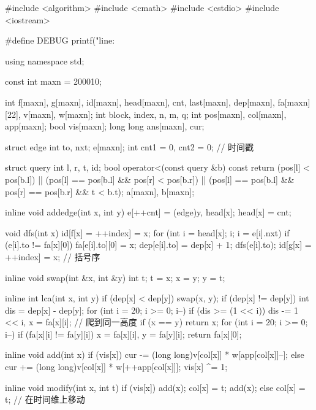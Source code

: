 \begin{cppcode}
#include <algorithm>
#include <cmath>
#include <cstdio>
#include <iostream>

#define DEBUG printf("line:%

using namespace std;

const int maxn = 200010;

int f[maxn], g[maxn], id[maxn], head[maxn], cnt, last[maxn], dep[maxn],
    fa[maxn][22], v[maxn], w[maxn];
int block, index, n, m, q;
int pos[maxn], col[maxn], app[maxn];
bool vis[maxn];
long long ans[maxn], cur;

struct edge {
  int to, nxt;
} e[maxn];
int cnt1 = 0, cnt2 = 0;  // 时间戳

struct query {
  int l, r, t, id;
  bool operator<(const query &b) const {
    return (pos[l] < pos[b.l]) || (pos[l] == pos[b.l] && pos[r] < pos[b.r]) ||
           (pos[l] == pos[b.l] && pos[r] == pos[b.r] && t < b.t);
  }
} a[maxn], b[maxn];

inline void addedge(int x, int y) {
  e[++cnt] = (edge){y, head[x]};
  head[x] = cnt;
}

void dfs(int x) {
  id[f[x] = ++index] = x;
  for (int i = head[x]; i; i = e[i].nxt) {
    if (e[i].to != fa[x][0]) {
      fa[e[i].to][0] = x;
      dep[e[i].to] = dep[x] + 1;
      dfs(e[i].to);
    }
  }
  id[g[x] = ++index] = x;  // 括号序
}

inline void swap(int &x, int &y) {
  int t;
  t = x;
  x = y;
  y = t;
}

inline int lca(int x, int y) {
  if (dep[x] < dep[y]) swap(x, y);
  if (dep[x] != dep[y]) {
    int dis = dep[x] - dep[y];
    for (int i = 20; i >= 0; i--)
      if (dis >= (1 << i)) dis -= 1 << i, x = fa[x][i];
  }  // 爬到同一高度
  if (x == y) return x;
  for (int i = 20; i >= 0; i--) {
    if (fa[x][i] != fa[y][i]) x = fa[x][i], y = fa[y][i];
  }
  return fa[x][0];
}

inline void add(int x) {
  if (vis[x])
    cur -= (long long)v[col[x]] * w[app[col[x]]--];
  else
    cur += (long long)v[col[x]] * w[++app[col[x]]];
  vis[x] ^= 1;
}

inline void modify(int x, int t) {
  if (vis[x]) {
    add(x);
    col[x] = t;
    add(x);
  } else
    col[x] = t;
}  // 在时间维上移动


\end{cppcode}
